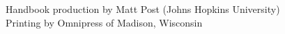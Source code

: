 \documentclass[twoside,makeidx]{book}
\begin{document}
\fancyfoot[C]{}

\fancyfoot[C]{\thepage}

\thispagestyle{empty}
\mbox{}

\vfill
\noindent Handbook production by Matt Post (Johns Hopkins University) \\  
Printing by Omnipress of Madison, Wisconsin
\newpage

\frontmatter

\clearpage%
\setheaders{}{}

\clearpage
%
\clearpage%
\setheaders{}{}

\setcounter{tocdepth}{2}
\tableofcontents
\mainmatter
\pagestyle{fancy}

%
\clearpage







\clearpage

\clearpage

\cleardoublepage
{}
\printindex

\cleardoublepage

\cleardoublepage

\end{document}
